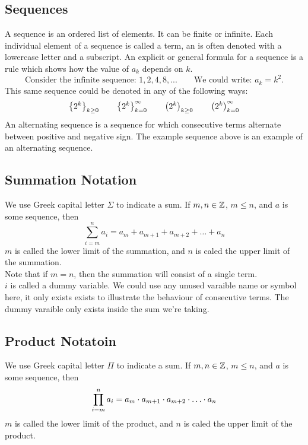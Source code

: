 \documentclass{report}
\begin{document}
\subsection*{Sequences}
A sequence is an ordered list of elements. It can be finite or infinite. Each individual element of a sequence is called a term, an is often denoted with a lowercase letter and a subscript. An explicit or general formula for a sequence is a rule which shows how the value of $a_k$ depends on $k$.
$$
	\text{Consider the infinite sequence: } 1, 2, 4, 8, ...\qquad \text{We could write: } a_k = k^2.
$$
This same sequence could be denoted in any of the following ways:
$$
	\left\lbrace 2^k \right\rbrace_{k\geq0}\qquad \left\lbrace 2^k \right\rbrace_{k=0}^{\infty}\qquad \left( 2^k \right)_{k\geq0}\qquad \left( 2^k \right)_{k=0}^{\infty}
$$
An alternating sequence is a sequence for which consecutive terms alternate between positive and negative sign. The example sequence above is an example of an alternating sequence.

\subsection*{Summation Notation}
We use Greek capital letter $\Sigma$ to indicate a sum. If $m,n\in\mathbb{Z}$, $m\leq n$, and $a$ is some sequence, then
$$
	\sum_{i=m}^{n} a_i = a_m + a_{m+1} + a_{m+2} + \dots + a_n
$$
$m$ is called the lower limit of the summation, and $n$ is caled the upper limit of the summation. \\
Note that if $m=n$, then the summation will consist of a single term. \\
$i$ is called a dummy variable. We could use any unused varaible name or symbol here, it only exists exists to illustrate the behaviour of consecutive terms. The dummy varaible only exists inside the sum we're taking.

\subsection*{Product Notatoin}
We use Greek capital letter $\Pi$ to indicate a sum. If $m,n\in\mathbb{Z}$, $m\leq n$, and $a$ is some sequence, then
$$
	\prod_{i=m}^{n} a_i = a_m \cd a_{m+1} \cd a_{m+2} \cd \dots \cd a_n
$$
$m$ is called the lower limit of the product, and $n$ is caled the upper limit of the product. \\
\end{document}
